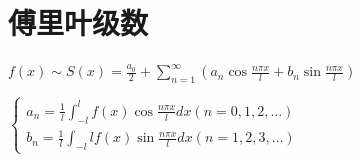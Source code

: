 \documentclass[UTF8]{ctexart}
\begin{document}
\section{傅里叶级数}
$f(x) \sim S(x) = \frac{a_0}{2} + \sum_{n=1}^\infty (a_n \cos{\frac{n  \pi x}{l}
 + b_n \sin \frac{n\pi x}{l}  })$

$\begin{cases}
a_n=\frac{1}{l} \int_{-l}^l f(x) \cos \frac{n \pi x}{l} dx (n=0,1,2, \ldots) \\
b_n=\frac{1}{l} \int_{-l}{l} f(x) \sin \frac{n \pi x}{l} dx (n=1,2,3,\ldots)
\end{cases}$
\end{document}
